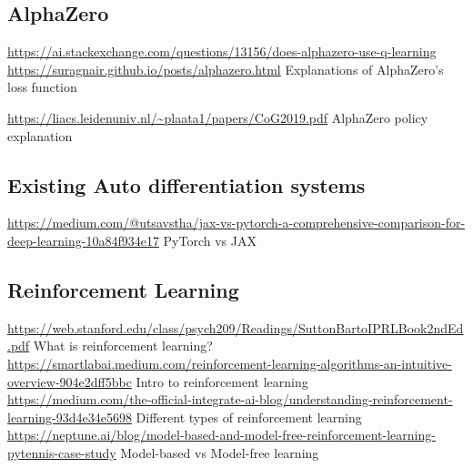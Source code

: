 \documentclass{article}
\begin{document}
    \subsection{AlphaZero}
    \noindent \url{https://ai.stackexchange.com/questions/13156/does-alphazero-use-q-learning}
    \noindent \url{https://suragnair.github.io/posts/alphazero.html}
    Explanations of AlphaZero's loss function

    \noindent \url{https://liacs.leidenuniv.nl/~plaata1/papers/CoG2019.pdf}
    AlphaZero policy explanation

    \subsection{Existing Auto differentiation systems}
    \noindent \url{https://medium.com/@utsavstha/jax-vs-pytorch-a-comprehensive-comparison-for-deep-learning-10a84f934e17}
    PyTorch vs JAX

    \subsection{Reinforcement Learning}
    \noindent \url{https://web.stanford.edu/class/psych209/Readings/SuttonBartoIPRLBook2ndEd.pdf} What is reinforcement learning?\\
    \noindent \url{https://smartlabai.medium.com/reinforcement-learning-algorithms-an-intuitive-overview-904e2dff5bbc} Intro to reinforcement learning\\
    \noindent \url{https://medium.com/the-official-integrate-ai-blog/understanding-reinforcement-learning-93d4e34e5698} Different types of reinforcement learning\\
    \noindent \url{https://neptune.ai/blog/model-based-and-model-free-reinforcement-learning-pytennis-case-study} Model-based vs Model-free learning\\
\end{document}

